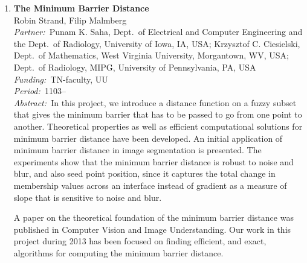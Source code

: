 \documentclass[10pt, a4paper]{article}
\newcommand{\aabstract}[1]{\emph{Abstract:~}#1}
\newcommand{\ffunding}[1]{\emph{Funding:~}#1\\}
\newcommand{\ppartner}[1]{\emph{Partner:~}#1\\}
\newcommand{\pperiod}[1]{\emph{Period:~}#1\\}
\begin{document}
\begin{enumerate}
\item 
\label{proj:MBD}
\textbf{The Minimum Barrier Distance}\\
Robin Strand, Filip Malmberg\\
\ppartner{Punam K. Saha, Dept.~of Electrical and Computer Engineering and the Dept.~of Radiology, University of Iowa, IA, USA; Krzysztof C. Ciesielski, Dept.~of Mathematics, West Virginia University, Morgantown, WV, USA; Dept.~of Radiology, MIPG, University of Pennsylvania, PA, USA}
\ffunding{TN-faculty, UU}
\pperiod{1103--}
\aabstract{In this project, we introduce a distance function on a fuzzy subset that gives the minimum barrier that has to be passed to go from one point to another. Theoretical properties as well as efficient computational solutions for minimum barrier distance have been developed. An initial application of minimum barrier distance in image segmentation is presented. The experiments show that the minimum barrier distance is robust to noise and blur, and also seed point position, since it captures the total change in membership values across an interface instead of gradient as a measure of slope that is sensitive to noise and blur.

A paper on the theoretical foundation of the minimum barrier distance was published in Computer Vision and Image Understanding. Our work in this project during 2013 has been focused on finding efficient, and exact, algorithms for computing the minimum barrier distance.}



\end{enumerate}
\end{document}
